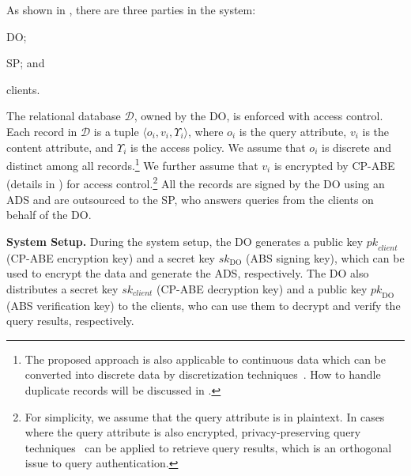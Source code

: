 As shown in , there are three parties in the system:
\begin{inlineenum}
\item DO\@;
\item SP\@; and
\item clients.
\end{inlineenum}
The relational database $\mathcal{D}$, owned by the DO, is enforced with access control. Each record in $\mathcal{D}$ is a tuple $\langle o_i, v_i, \Upsilon_i\rangle$, where $o_i$ is the query attribute, $v_i$ is the content attribute, and $\Upsilon_i$ is the access policy. We assume that $o_i$ is discrete and distinct among all records.\footnote{The proposed approach is also applicable to continuous data which can be converted into discrete data by discretization techniques~\cite{Kotsiantis2006}. How to handle duplicate records will be discussed in .} We further assume that $v_i$ is encrypted by CP-ABE~\cite{10.1109/sp.2007.11} (details in ) for access control.\footnote{For simplicity, we assume that the query attribute is in plaintext. In cases where the query attribute is also encrypted,
privacy-preserving query techniques~\cite{10.1145/2699026.2699101} can be applied to retrieve query results, which is an orthogonal issue to query authentication.}
All the records are signed by the DO using an ADS and are outsourced to the SP, who answers queries from the clients on behalf of the DO\@.

\textbf{System Setup.}
During the system setup, the DO generates a public key ${pk}_{client}$ (CP-ABE encryption key) and a secret key ${sk}_\text{DO}$ (ABS signing key), which can be used to encrypt the data and generate the ADS, respectively. The DO also distributes a secret key ${sk}_{client}$ (CP-ABE decryption key) and a public key ${pk}_\text{DO}$ (ABS verification key) to the clients, who can use them to decrypt and verify the query results, respectively.

